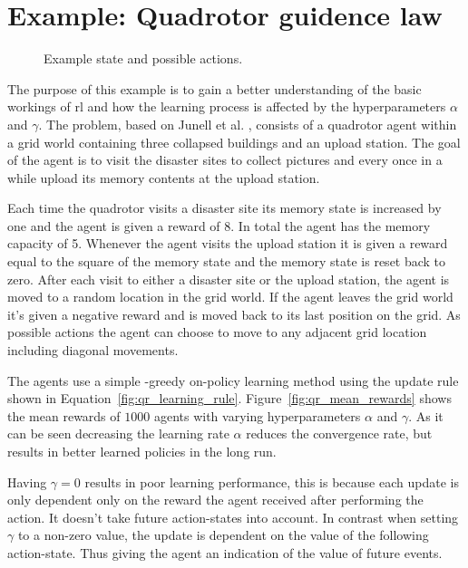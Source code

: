 \section{Example: Quadrotor guidence law}
\begin{figure}        
    \begin{center}        
        		
    \end{center}    
    \caption{Example state and possible actions.}
    \label{fig:qr_exaple_state}    
\end{figure}

The purpose of this example is to gain a better understanding of the basic workings of \acrlong{rl} and how the learning process is affected by the hyperparameters $\alpha$ and $\gamma$. The problem, based on Junell et al. \cite{junell2015reinforcement}, consists of a quadrotor agent within a grid world containing three collapsed buildings and an upload station. The goal of the agent is to visit the disaster sites to collect pictures and every once in a while upload its memory contents at the upload station.

Each time the quadrotor visits a disaster site its memory state is increased by one and the agent is given a reward of 8. In total the agent has the memory capacity of 5. Whenever the agent visits the upload station it is given a reward equal to the square of the memory state and the memory state is reset back to zero. After each visit to either a disaster site or the upload station, the agent is moved to a random location in the grid world. If the agent leaves the grid world it's given a negative reward and is moved back to its last position on the grid. As possible actions the agent can choose to move to any adjacent grid location including diagonal movements.

The agents use a simple \eps-greedy on-policy learning method using the update rule shown in Equation~\ref{fig:qr_learning_rule}. Figure~\ref{fig:qr_mean_rewards} shows the mean rewards of $1000$ agents with varying hyperparameters $\alpha$ and $\gamma$. As it can be seen decreasing the learning rate $\alpha$ reduces the convergence rate, but results in better learned policies in the long run.

Having $\gamma=0$ results in poor learning performance, this is because each update is only dependent only on the reward the agent received after performing the action. It doesn't take future action-states into account. In contrast when setting $\gamma$ to a non-zero value, the update is dependent on the value of the following action-state. Thus giving the agent an indication of the value of future events.

